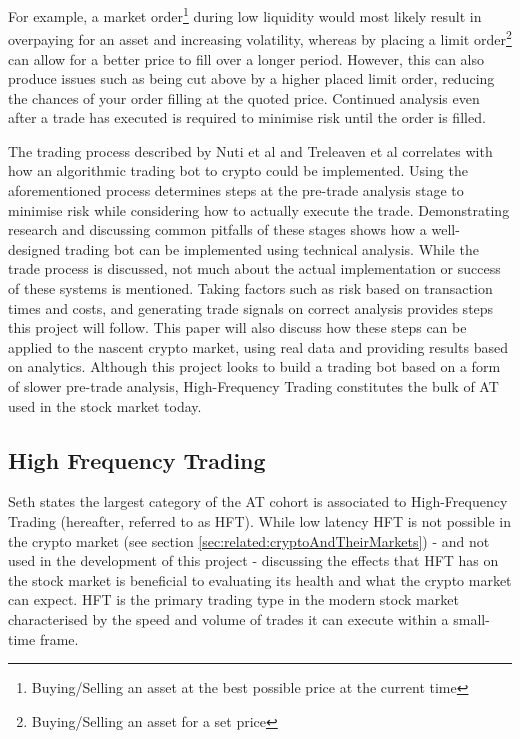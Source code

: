 For example, a market order\footnote{Buying/Selling an asset at the best possible price at the current time} during low liquidity would most likely result in overpaying for an asset and increasing volatility, whereas by placing a limit order\footnote{Buying/Selling an asset for a set price} can allow for a better price to fill over a longer period. However, this can also produce issues such as being cut above by a higher placed limit order, reducing the chances of your order filling at the quoted price. Continued analysis even after a trade has executed is required to minimise risk until the order is filled.

The trading process described by Nuti et al \cite{ART:Nuti:2011} and Treleaven et al \cite{ART:Treleaven:2013} correlates with how an algorithmic trading bot to crypto could be implemented. Using the aforementioned process determines steps at the pre-trade analysis stage to minimise risk while considering how to actually execute the trade. Demonstrating research and discussing common pitfalls of these stages shows how a well-designed trading bot can be implemented using technical analysis. While the trade process is discussed, not much about the actual implementation or success of these systems is mentioned. Taking factors such as risk based on transaction times and costs, and generating trade signals on correct analysis provides steps this project will follow. This paper will also discuss how these steps can be applied to the nascent crypto market, using real data and providing results based on analytics. Although this project looks to build a trading bot based on a form of slower pre-trade analysis, High-Frequency Trading constitutes the bulk of AT used in the stock market today. 

\subsection{High Frequency Trading}
\label{sec:related:algoTrading:HFT}
\noindent  Seth \cite{WEB:SETH:0001} states the largest category of the AT cohort is associated to High-Frequency Trading (hereafter, referred to as HFT). While low latency HFT is not possible in the crypto market (see section \ref{sec:related:cryptoAndTheirMarkets}) - and not used in the development of this project - discussing the effects that HFT has on the stock market is beneficial to evaluating its health and what the crypto market can expect. HFT is the primary trading type in the modern stock market characterised by the speed and volume of trades it can execute within a small-time frame.

